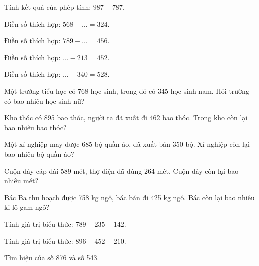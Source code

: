 \begin{ex}
Tính kết quả của phép tính: $987 - 787$.
\end{ex}

\begin{ex}
Điền số thích hợp: $568 - \dots = 324$.
\end{ex}

\begin{ex}
Điền số thích hợp: $789 - \dots = 456$.
\end{ex}

\begin{ex}
Điền số thích hợp: $\dots - 213 = 452$.
\end{ex}

\begin{ex}
Điền số thích hợp: $\dots - 340 = 528$.
\end{ex}

\begin{ex}
Một trường tiểu học có 768 học sinh, trong đó có 345 học sinh nam. Hỏi trường có bao nhiêu học sinh nữ?
\end{ex}

\begin{ex}
Kho thóc có 895 bao thóc, người ta đã xuất đi 462 bao thóc. Trong kho còn lại bao nhiêu bao thóc?
\end{ex}

\begin{ex}
Một xí nghiệp may được 685 bộ quần áo, đã xuất bán 350 bộ. Xí nghiệp còn lại bao nhiêu bộ quần áo?
\end{ex}

\begin{ex}
Cuộn dây cáp dài 589 mét, thợ điện đã dùng 264 mét. Cuộn dây còn lại bao nhiêu mét?
\end{ex}

\begin{ex}
Bác Ba thu hoạch được 758 kg ngô, bác bán đi 425 kg ngô. Bác còn lại bao nhiêu ki-lô-gam ngô?
\end{ex}

\begin{ex}
Tính giá trị biểu thức: $789 - 235 - 142$.
\end{ex}

\begin{ex}
Tính giá trị biểu thức: $896 - 452 - 210$.
\end{ex}

\begin{ex}
Tìm hiệu của số 876 và số 543.
\end{ex}
